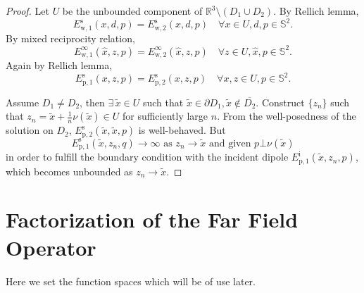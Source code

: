 \begin{proof}
  Let $U$ be the unbounded component of $\mathbb{R}^3\setminus(D_1\cup D_2)$. 
  By Rellich lemma, 
  $$E_{\text{w},1}^\text{s}(x, d, p)=E_{\text{w},2}^\text{s}(x, d, p)\quad\forall x\in U, d, p\in\mathbb{S}^2.$$ 
  By mixed reciprocity relation,
  $$E_{\text{w},1}^\infty(\hat{x}, z, p)=E_{\text{w},2}^\infty(\hat{x}, z, p)\quad\forall z\in U, \hat{x}, p\in\mathbb{S}^2.$$ 
  Again by Rellich lemma,
  $$E_{\text{p},1}^\text{s}(x, z, p)=E_{\text{p},2}^\text{s}(x, z, p)\quad\forall x, z\in U, p\in\mathbb{S}^2.$$

  Assume $D_1\not=D_2$, then $\exists\,\tilde{x}\in U$ such that $\tilde{x}\in\partial D_1, \tilde{x}\not\in\overline{D_2}$. Construct $\{z_n\}$ such that $z_n=\tilde{x}+\frac{1}{n}\nu(\tilde{x})\in U$ for sufficiently large $n$. From the well-posedness of the solution on $D_2$, $E_{\text{p},2}^\text{s}(\tilde{x}, \tilde{x}, p)$ is well-behaved. But $$E_{\text{p},1}^\text{s}(\tilde{x}, z_n, q)\to\infty\text{ as } z_n\to\tilde{x}\text{ and given } p\bot\nu(\tilde{x})$$ in order to fulfill the boundary condition with the incident dipole $E_{\text{p},1}^\text{i}(\tilde{x}, z_n, p)$, which becomes unbounded as $z_n\to\tilde{x}$.

\end{proof}

\section{Factorization of the Far Field Operator}

Here we set the function spaces which will be of use later.

